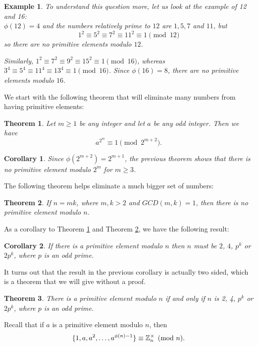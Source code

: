 \documentclass[12pt]{article}
\theoremstyle{plain}
\newtheorem{corollary}{Corollary}
\newtheorem{example}{Example}
\newtheorem{theorem}{Theorem}
\theoremstyle{definition}
\theoremstyle{remark}
\begin{document}
\begin{example}
To understand this question more, let us look at the example of 12 and 16:
\\ $\phi(12)=4$ and the numbers relatively prime to $12$ are $1, 5, 7$ and $11$, but 
$$1^2\equiv 5^2\equiv 7^2\equiv 11^2 \equiv 1 \pmod{12}$$ so there are no primitive elements modulo $12$.

Similarly, $1^2 \equiv 7^2 \equiv 9^2 \equiv 15^2 \equiv 1 \pmod{16}$, whereas $3^4 \equiv5^4\equiv 11^4 \equiv 13^4 \equiv 1 \pmod{16}$. Since $\phi(16)=8$, there are no primitive elements modulo $16$. 
\end{example}

\bigskip
\noindent
We start with the following theorem that will eliminate many numbers from having primitive elements:
\begin{theorem}\label{prim1}
Let $m\geq 1$ be any integer and let $a$ be any odd integer. Then we have
$$a^{2^m} \equiv 1 \pmod{2^{m+2}}.$$
\end{theorem}
\begin{corollary}
Since $\phi(2^{m+2})=2^{m+1}$, the previous theorem shows that there is no primitive element modulo $2^{m}$ for $m\geq 3$.
\end{corollary}

The following theorem helps eliminate a much bigger set of numbers:
\begin{theorem}\label{prim2}
If $n=mk$, where $m,k>2$ and $GCD(m,k)=1$, then there is no primitive element modulo $n$.
\end{theorem}

\bigskip
\noindent
As a corollary to Theorem \ref{prim1} and Theorem \ref{prim2}, we have the following result:
\begin{corollary}
If there is a primitive element modulo $n$ then $n$ must be $2$, $4$, $p^k$ or $2p^k$, where $p$ is an odd prime. 
\end{corollary}

It turns out that the result in the previous corollary is actually two sided, which is a theorem that we will give without a proof.
\begin{theorem}
There is a primitive element modulo $n$ if and only if $n$ is 2, 4, $p^k$ or $2p^k$, where $p$ is an odd prime. 
\end{theorem}

\bigskip
\noindent
Recall that if $a$ is a primitive element modulo $n$, then 
$$\{1, a, a^2, \dots, a^{\phi(n)-1}\} \equiv \mathbb{Z}_n^{\times} \pmod{n}.$$
\end{document}
